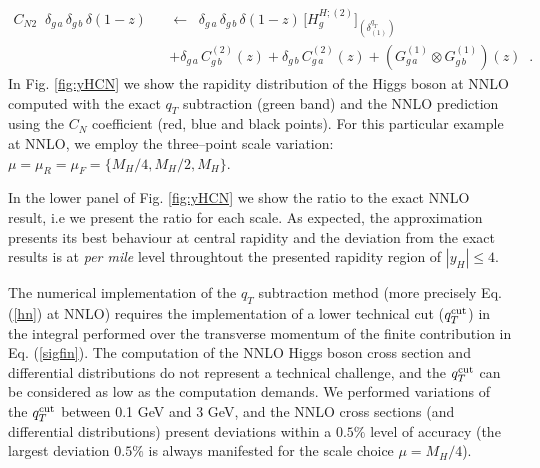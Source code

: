 \documentclass[12pt]{article}
\def\beeq{\begin{eqnarray}}
\def\eeeq{\end{eqnarray}}
\def\nn{\nonumber}
\def\qt{q_T}
\begin{document}
\beeq
\label{CNeq}
C_{N2}\;\;\delta_{g\,a} \,\delta_{g\,b} \,\delta(1-z) && \!\!\!\!\!\! \leftarrow\;\; \delta_{g\,a} \,\delta_{g\,b} \,\delta(1-z)
\, \big[H^{H;(2)}_{g}\big]_{(\delta^{\qt}_{(1)})}\nn\\
&&+\delta_{g\,a} \,C^{(2)}_{g\,b}(z)+\delta_{g\,b} \,C^{(2)}_{g\,a}(z)+
\left(G^{(1)}_{g\,a}\otimes G^{(1)}_{g\,b}\right)(z)\;\; .
\eeeq 
In Fig. \ref{fig:yHCN} we show the rapidity distribution of the Higgs boson at NNLO computed with the exact $\qt$ subtraction (green band) and the NNLO prediction using the $C_{N}$ coefficient (red, blue and black points). For this particular example at NNLO, we employ the three--point scale variation: $\mu=\mu_{R}=\mu_{F}=\{M_{H}/4,M_{H}/2,M_{H}\}$. 

In the lower panel of Fig. \ref{fig:yHCN} we show the ratio to the exact NNLO result, i.e we present the ratio for each scale. As expected, the approximation presents its best behaviour at central rapidity and the deviation from the exact results is at \textit{per mile} level throughtout the presented rapidity region of $|y_{H}|\leq 4$.

The numerical implementation of the $\qt$ subtraction method (more precisely Eq. (\ref{hn}) at NNLO) requires the implementation of a lower technical cut ($q_{T}^{\rm cut}$) in the integral performed over the transverse momentum of the finite contribution in Eq. (\ref{sigfin}). The computation of the NNLO Higgs boson cross section and differential distributions do not represent a technical challenge, and the $q_{T}^{\rm cut}$ can be considered as low as the computation demands. We performed variations of the $q_{T}^{\rm cut}$ between 0.1 GeV and 3 GeV, and the NNLO cross sections (and differential distributions) present deviations within a $0.5\%$ level of accuracy (the largest deviation $0.5\%$ is always manifested for the scale choice $\mu=M_{H}/4$).

\end{document}
